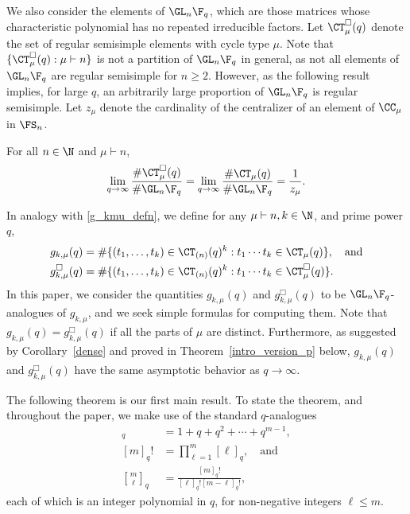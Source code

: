 We also consider the  elements of \(\GL_n \F_q\), which are those matrices whose characteristic polynomial has no repeated irreducible factors.
Let \(\CT_\mu^\Box (q)\) denote the set of regular semisimple elements with cycle type \(\mu\).
Note that \(\{\CT_\mu^\Box (q) : \mu \vdash n\}\) is not a partition of \(\GL_n \F_q\) in general, as not all elements of \(\GL_n \F_q\) are regular semisimple for \(n \geq 2\).
However, as the following result implies, for large \(q\), an arbitrarily large proportion of \(\GL_n \F_q\) is regular semisimple.
Let \(z_\mu\) denote the cardinality of the centralizer of an element of \(\CC_\mu\) in \(\FS_n\).

\begin{corollary}
\label{cycle_type_ratio_limit}
For all \(n \in \N\) and \(\mu \vdash n\),
\label{dense}
\[
\lim_{q \to \infty} \frac{\# \CT_\mu^\Box (q)}{\# \GL_n \F_q} = \lim_{q \to \infty} \frac{\# \CT_\mu (q)}{\# \GL_n \F_q} = \frac{1}{z_\mu}.
\]
\end{corollary}

In analogy with \eqref{g_kmu_defn}, we define for any \(\mu \vdash n, k \in \N\), and prime power \(q\),
\begin{align*}
g_{k,\mu} (q)
& =
\# \{ (t_1,\ldots,t_k) \in \CT_{(n)} (q)^k : t_1 \cdots t_k \in \CT_\mu (q) \}, \quad \text{and} \\
g_{k,\mu}^\Box (q)
& =
\# \{ (t_1,\ldots,t_k) \in \CT_{(n)} (q)^k : t_1 \cdots t_k \in \CT_\mu^\Box (q) \}.
\end{align*}
In this paper, we consider the quantities \(g_{k,\mu}(q)\) and \(g_{k,\mu}^\Box (q)\) to be \(\GL_n \F_q\)-analogues of \(g_{k,\mu}\),
and we seek simple formulas for computing them.
Note that \(g_{k,\mu} (q) = g_{k,\mu}^\Box (q)\) if all the parts of \(\mu\) are distinct.
Furthermore, as suggested by Corollary~\ref{dense} and proved in Theorem~\ref{intro_version_p} below, \(g_{k,\mu} (q)\) and \(g_{k,\mu}^\Box (q)\) have the same asymptotic behavior as \(q \to \infty\).

The following theorem is our first main result.
To state the theorem, and throughout the paper, we make use of the standard \(q\)-analogues
\begin{align}
[m]_q  & = 1 + q + q^2 + \cdots + q^{m-1},
\label{x_analogue_of_n}\\
[m]_q! & = \prod_{\ell = 1}^{m} [\ell]_q, \quad \text{and}
\label{x_analogue_of_n_factorial}\\
{\genfrac[]{0pt}{1}{m}{\ell}}_q
& = \frac{[m]_q!}{[\ell]_q! [m-\ell]_q!},
\label{x_analogue_of_n_choose_k}
\end{align}
each of which is an integer polynomial in \(q\), for non-negative integers \(\ell \leq m\).


